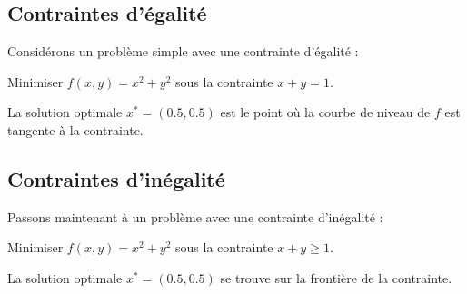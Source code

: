 \subsection{Contraintes d'égalité}
Considérons un problème simple avec une contrainte d'égalité :
\begin{example}
    Minimiser \( f(x, y) = x^2 + y^2 \) sous la contrainte \( x + y = 1 \).

    \begin{center}
    \end{center}

    La solution optimale \( x^* = (0.5, 0.5) \) est le point où la courbe de niveau de \( f \) est tangente à la contrainte.
\end{example}

\subsection{Contraintes d'inégalité}

Passons maintenant à un problème avec une contrainte d'inégalité :

\begin{example}
    Minimiser \( f(x, y) = x^2 + y^2 \) sous la contrainte \( x + y \geq 1 \).

    \begin{center}
    \end{center}

    La solution optimale \( x^* = (0.5, 0.5) \) se trouve sur la frontière de la contrainte.
\end{example}

